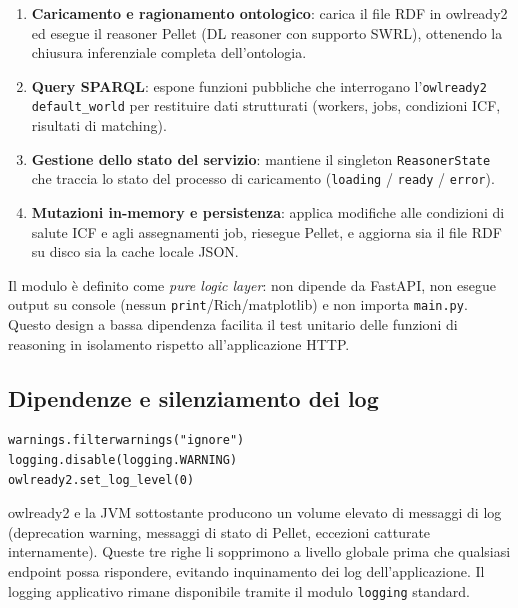 \documentclass[a4paper,12pt]{article}
\begin{document}
\begin{enumerate}
  \item \textbf{Caricamento e ragionamento ontologico}: carica il file RDF
        in owlready2 ed esegue il reasoner Pellet (DL reasoner con supporto
        SWRL), ottenendo la chiusura inferenziale completa dell'ontologia.
  \item \textbf{Query SPARQL}: espone funzioni pubbliche che interrogano
        l'\texttt{owlready2 default\_world} per restituire dati strutturati
        (workers, jobs, condizioni ICF, risultati di matching).
  \item \textbf{Gestione dello stato del servizio}: mantiene il singleton
        \texttt{ReasonerState} che traccia lo stato del processo di
        caricamento (\texttt{loading} / \texttt{ready} / \texttt{error}).
  \item \textbf{Mutazioni in-memory e persistenza}: applica modifiche alle
        condizioni di salute ICF e agli assegnamenti job, riesegue Pellet,
        e aggiorna sia il file RDF su disco sia la cache locale JSON.
\end{enumerate}

\begin{infobox}
Il modulo \`{e} definito come \textit{pure logic layer}: non dipende da
FastAPI, non esegue output su console (nessun \texttt{print}/Rich/matplotlib)
e non importa \texttt{main.py}. Questo design a bassa dipendenza facilita
il test unitario delle funzioni di reasoning in isolamento rispetto
all'applicazione HTTP.
\end{infobox}

\subsection{Dipendenze e silenziamento dei log}

\begin{lstlisting}[caption={Silencing dei log rumorosi di owlready2 e Java.}]
warnings.filterwarnings("ignore")
logging.disable(logging.WARNING)
owlready2.set_log_level(0)
\end{lstlisting}

owlready2 e la JVM sottostante producono un volume elevato di messaggi
di log (deprecation warning, messaggi di stato di Pellet, eccezioni
catturate internamente). Queste tre righe li sopprimono a livello
globale prima che qualsiasi endpoint possa rispondere, evitando
inquinamento dei log dell'applicazione. Il logging applicativo rimane
disponibile tramite il modulo \texttt{logging} standard.
\end{document}
